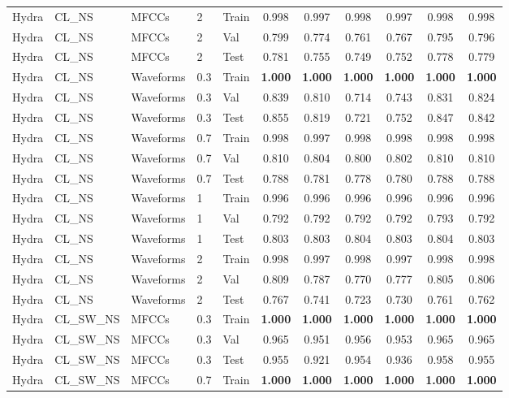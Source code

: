 \begin{landscape}
\begin{longtable}{|l|l|l|l|l|c|c|c|c|c|c|}
Hydra & CL\_NS & MFCCs & 2 & Train & 0.998 & 0.997 & 0.998 & 0.997 & 0.998 & 0.998 \\
Hydra & CL\_NS & MFCCs & 2 & Val & 0.799 & 0.774 & 0.761 & 0.767 & 0.795 & 0.796 \\
Hydra & CL\_NS & MFCCs & 2 & Test & 0.781 & 0.755 & 0.749 & 0.752 & 0.778 & 0.779 \\
Hydra & CL\_NS & Waveforms & 0.3 & Train & \textbf{1.000} & \textbf{1.000} & \textbf{1.000} & \textbf{1.000} & \textbf{1.000} & \textbf{1.000} \\
Hydra & CL\_NS & Waveforms & 0.3 & Val & 0.839 & 0.810 & 0.714 & 0.743 & 0.831 & 0.824 \\
Hydra & CL\_NS & Waveforms & 0.3 & Test & 0.855 & 0.819 & 0.721 & 0.752 & 0.847 & 0.842 \\
Hydra & CL\_NS & Waveforms & 0.7 & Train & 0.998 & 0.997 & 0.998 & 0.998 & 0.998 & 0.998 \\
Hydra & CL\_NS & Waveforms & 0.7 & Val & 0.810 & 0.804 & 0.800 & 0.802 & 0.810 & 0.810 \\
Hydra & CL\_NS & Waveforms & 0.7 & Test & 0.788 & 0.781 & 0.778 & 0.780 & 0.788 & 0.788 \\
Hydra & CL\_NS & Waveforms & 1 & Train & 0.996 & 0.996 & 0.996 & 0.996 & 0.996 & 0.996 \\
Hydra & CL\_NS & Waveforms & 1 & Val & 0.792 & 0.792 & 0.792 & 0.792 & 0.793 & 0.792 \\
Hydra & CL\_NS & Waveforms & 1 & Test & 0.803 & 0.803 & 0.804 & 0.803 & 0.804 & 0.803 \\
Hydra & CL\_NS & Waveforms & 2 & Train & 0.998 & 0.997 & 0.998 & 0.997 & 0.998 & 0.998 \\
Hydra & CL\_NS & Waveforms & 2 & Val & 0.809 & 0.787 & 0.770 & 0.777 & 0.805 & 0.806 \\
Hydra & CL\_NS & Waveforms & 2 & Test & 0.767 & 0.741 & 0.723 & 0.730 & 0.761 & 0.762 \\
Hydra & CL\_SW\_NS & MFCCs & 0.3 & Train & \textbf{1.000} & \textbf{1.000} & \textbf{1.000} & \textbf{1.000} & \textbf{1.000} & \textbf{1.000} \\
Hydra & CL\_SW\_NS & MFCCs & 0.3 & Val & 0.965 & 0.951 & 0.956 & 0.953 & 0.965 & 0.965 \\
Hydra & CL\_SW\_NS & MFCCs & 0.3 & Test & 0.955 & 0.921 & 0.954 & 0.936 & 0.958 & 0.955 \\
Hydra & CL\_SW\_NS & MFCCs & 0.7 & Train & \textbf{1.000} & \textbf{1.000} & \textbf{1.000} & \textbf{1.000} & \textbf{1.000} & \textbf{1.000} \\

\end{longtable}
\end{landscape}
